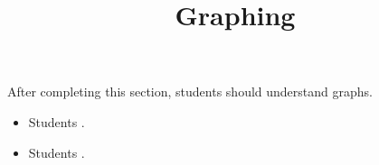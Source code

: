 \documentclass{ximera}
\title{Graphing}
\begin{document}
\begin{abstract}
\end{abstract}

\maketitle

\begin{sectionOutcomes}

After completing this section, students should understand graphs. 

\begin{itemize}
\item Students .
\item Students .
\end{itemize}

\end{sectionOutcomes}
\end{document}
